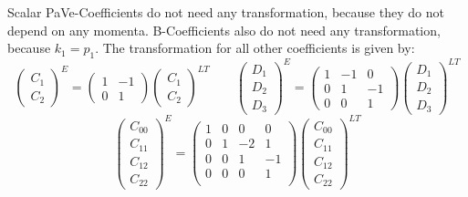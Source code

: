 Scalar PaVe-Coefficients do not need any transformation, because they do not depend on any momenta. B-Coefficients also do not need any transformation, because $k_1=p_1$. The transformation for all other coefficients is given by:
\begin{equation}
\begin{pmatrix}C_1\\C_2\end{pmatrix}^{E} = \begin{pmatrix}1&-1\\0&1\end{pmatrix}\begin{pmatrix}C_1\\C_2\end{pmatrix}^{LT}
\qquad
\begin{pmatrix}D_1\\D_2\\D_3\end{pmatrix}^{E} = \begin{pmatrix}1&-1&0\\0&1&-1\\0&0&1\end{pmatrix}\begin{pmatrix}D_1\\D_2\\D_3\end{pmatrix}^{LT}
\end{equation}
\begin{equation}
\begin{pmatrix}C_{00}\\C_{11}\\C_{12}\\C_{22}\end{pmatrix}^{E} =
\begin{pmatrix}
 1 & 0 & 0 & 0 \\
 0 & 1 & -2 & 1 \\
 0 & 0 & 1 & -1 \\
 0 & 0 & 0 & 1 \\
\end{pmatrix}
\begin{pmatrix}C_{00}\\C_{11}\\C_{12}\\C_{22}\end{pmatrix}^{LT}
\end{equation}
